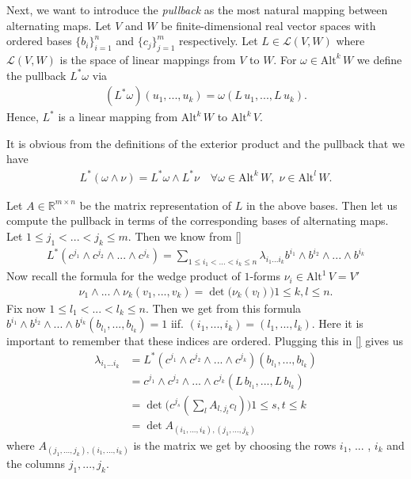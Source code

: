 \documentclass[12pt,a4paper]{article}
\numberwithin{equation}{subsection}
\numberwithin{lemma}{subsection}
\theoremstyle{definition}
\newcommand{\alternating}[2]{ {\text{Alt}^{#1}\,#2} }
\newcommand{\real}{\mathbb{R}}
\begin{document}
Next, we want to introduce the \textit{pullback} as the most natural 
mapping between alternating maps. Let $V$ and $W$ be finite-dimensional real
vector spaces with ordered bases $\{ b_i \}_{i=1}^n$ and $\{c_j\}_{j=1}^m$ 
respectively. Let $L \in \mathcal{L}(V,W)$ where $\mathcal{L}(V,W)$ is the 
space of linear mappings from $V$ to $W$. For $\omega \in \alternating{k}{W}$
we define the pullback $L^* \omega$ via 
\begin{align*}
    (L^* \omega)(u_1,...,u_k) = \omega(L\,u_1,...,L\,u_k).
\end{align*}
Hence, $L^*$ is a linear mapping from $\alternating{k}{W}$ to 
$\alternating{k}{V}$. 

It is obvious from the definitions of the exterior product and 
the pullback that we have 
\begin{align*}
    L^*(\omega \wedge \nu) = L^*\omega \wedge L^* \nu \quad \forall 
        \omega \in \alternating{k}{W}, \; \nu \in \alternating{l}{W}.
\end{align*}

Let $A \in \real^{m\times n}$ be the matrix representation of $L$ in the 
above bases. Then let us compute the pullback in terms of the corresponding 
bases of alternating maps. Let $1 \leq j_1 < ... <j_k \leq m$. 
Then we know from \ref{}
\begin{align*}
    L^* (c^{j_1} \wedge c^{j_2} \wedge ... \wedge c^{j_k})
    = \sum\limits_{1 \leq i_1 < ... < i_k \leq n} 
    \lambda_{i_1 ... i_k} b^{i_1} \wedge b^{i_2} \wedge ... \wedge b^{i_k}
\end{align*}
Now recall the formula for the wedge product of $1$-forms 
$\nu_i \in \alternating{1}{V} = V'$
\begin{align*}
    \nu_1 \wedge ... \wedge \nu_k (v_1,...,v_k) = 
    \det \big( \nu_k(v_l) \big) 1 \leq k,l \leq n.
\end{align*}
Fix now $1 \leq l_1 < ... <  l_k \leq n$. Then we get from this formula
$b^{i_1} \wedge b^{i_2} \wedge ... \wedge b^{i_k} ( b_{l_1},...,b_{l_k}) = 1$ 
iif. $(i_1,...,i_k) = (l_1,...,l_k)$. Here it is important to remember that 
these indices are ordered. Plugging this in \ref{} gives us 
\begin{align*}
    \lambda_{i_1 ... i_k}  &= 
        L^* (c^{j_1} \wedge c^{j_2} \wedge ... \wedge c^{j_k})
        (b_{l_1},...,b_{l_k})
    \\ &= c^{j_1} \wedge c^{j_2} \wedge ... \wedge c^{j_k} 
        (L\,b_{l_1},...,L\,b_{l_k})
    \\ &= \det \big( c^{j_s}(\sum_l A_{l,j_t}c_l) \big) 1 \leq s,t \leq k
    \\ &= \det A_{(i_1,...,i_k),(j_1,...,j_k)}
\end{align*}
where $A_{(j_1,...,j_k),(i_1,...,i_k)}$ is the matrix we get 
by choosing the rows $i_1$, ... , $i_k$ and the columns $j_1,...,j_k$.
\end{document}
